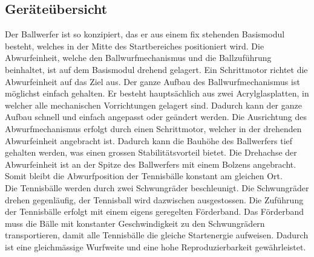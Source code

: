 \subsection{Geräteübersicht}
Der Ballwerfer ist so konzipiert, das er aus einem fix stehenden Basismodul besteht, 
welches in der Mitte des Startbereiches positioniert wird. Die Abwurfeinheit, 
welche den Ballwurfmechanismus und die Ballzuführung beinhaltet, ist auf dem Basismodul drehend gelagert. 
Ein Schrittmotor richtet die Abwurfeinheit auf das Ziel aus. Der ganze Aufbau des Ballwurfmechanismus ist möglichst einfach gehalten. 
Er besteht hauptsächlich aus zwei Acrylglasplatten, in welcher alle mechanischen Vorrichtungen gelagert sind. 
Dadurch kann der ganze Aufbau schnell und einfach angepasst oder geändert werden. 
Die Ausrichtung des Abwurfmechanismus erfolgt durch einen Schrittmotor, welcher in der drehenden Abwurfeinheit angebracht ist. 
Dadurch kann die Bauhöhe des Ballwerfers tief gehalten werden, was einen grossen Stabilitätsvorteil bietet. 
Die Drehachse der Abwurfeinheit ist an der Spitze des Ballwerfers mit einem Bolzens angebracht. 
Somit bleibt die Abwurfposition der Tennisbälle konstant am gleichen Ort.\\
Die Tennisbälle werden durch zwei Schwungräder beschleunigt. Die Schwungräder drehen gegenläufig, 
der Tennisball wird dazwischen ausgestossen. Die Zuführung der Tennisbälle erfolgt mit einem eigens geregelten Förderband. 
Das Förderband muss die Bälle mit konstanter Geschwindigkeit zu den Schwungrädern transportieren, 
damit alle Tennisbälle die gleiche Startenergie aufweisen. 
Dadurch ist eine gleichmässige Wurfweite und eine hohe Reproduzierbarkeit gewährleistet. \\
